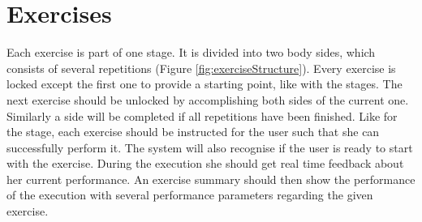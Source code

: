 \section{Exercises}\label{4_4_exercises}
Each exercise is part of one stage. It is divided into two body sides, which consists of several repetitions (Figure \ref{fig:exerciseStructure}). Every exercise is locked except the first one to provide a starting point, like with the stages. The next exercise should be unlocked by accomplishing both sides of the current one. Similarly a side will be completed if all repetitions have been finished. Like for the stage, each exercise should be instructed for the user such that she can successfully perform it. The system will also recognise if the user is ready to start with the exercise. During the execution she should get real time feedback about her current performance. An exercise summary should then show the performance of the execution with several performance parameters regarding the given exercise.

